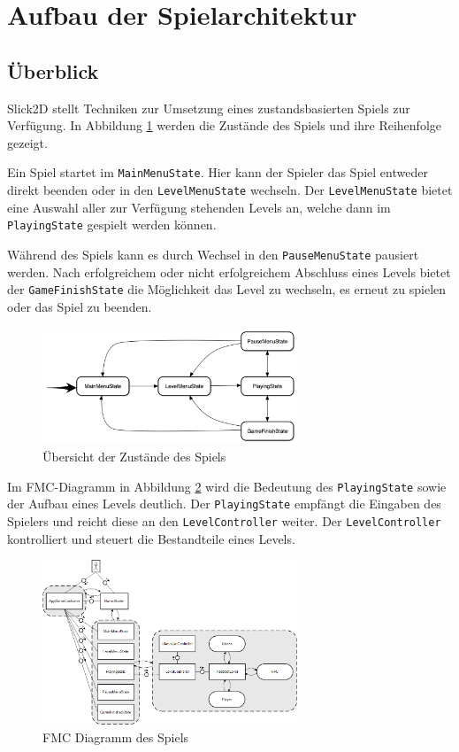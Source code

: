 \section{Aufbau der Spielarchitektur}
\label{sec:architektur}

\subsection{Überblick}
\label{sub:architektur:ueberblick}

Slick2D stellt Techniken zur Umsetzung eines zustandsbasierten Spiels zur Verfügung.
In Abbildung \ref{fig:spielarchitektur:states} werden die Zustände des Spiels und ihre Reihenfolge gezeigt.

Ein Spiel startet im \texttt{MainMenuState}.
Hier kann der Spieler das Spiel entweder direkt beenden oder in den \texttt{LevelMenuState} wechseln.
Der \texttt{LevelMenuState} bietet eine Auswahl aller zur Verfügung stehenden Levels an, welche dann im \texttt{PlayingState} gespielt werden können.

Während des Spiels kann es durch Wechsel in den \texttt{PauseMenuState} pausiert werden.
Nach erfolgreichem oder nicht erfolgreichem Abschluss eines Levels bietet der \texttt{GameFinishState} die Möglichkeit das Level zu wechseln, es erneut zu spielen oder das Spiel zu beenden.

\begin{figure}[]
\centering
\includegraphics[width=3in]{img/05_states.png}
\caption{Übersicht der Zustände des Spiels}
\label{fig:spielarchitektur:states}
\end{figure}

Im FMC-Diagramm in Abbildung \ref{fig:spielarchitektur:fmc} wird die Bedeutung des \texttt{PlayingState} sowie der Aufbau eines Levels deutlich.
Der \texttt{PlayingState} empfängt die Eingaben des Spielers und reicht diese an den \texttt{LevelController} weiter.
Der \texttt{LevelController} kontrolliert und steuert die Bestandteile eines Levels.

\begin{figure}[]
\centering
\includegraphics[width=3in]{img/05_fmc.png}
\caption{FMC Diagramm des Spiels}
\label{fig:spielarchitektur:fmc}
\end{figure}

